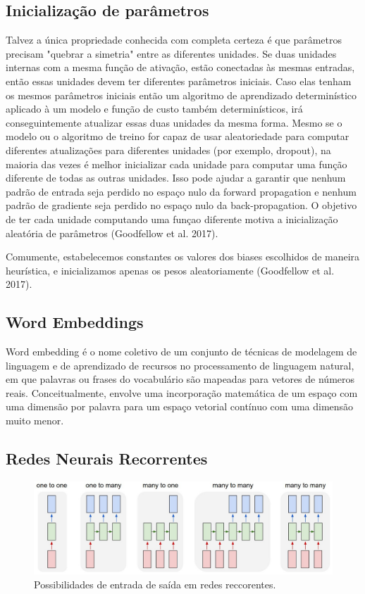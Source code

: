 \documentclass[12pt]{article}
\begin{document}
\subsection{Inicialização de parâmetros}

Talvez a única propriedade conhecida com completa certeza é que parâmetros precisam "quebrar a simetria" entre as diferentes unidades. Se duas unidades internas com a mesma função de ativação, estão conectadas às mesmas entradas, então essas unidades devem ter diferentes parâmetros iniciais. Caso elas tenham os mesmos parâmetros iniciais então um algoritmo de aprendizado determinístico aplicado à um modelo e função de custo também determinísticos, irá conseguintemente atualizar essas duas unidades da mesma forma. Mesmo se o modelo ou o algoritmo de treino for capaz de usar aleatoriedade para computar diferentes atualizações para diferentes unidades (por exemplo, dropout), na maioria das vezes é melhor inicializar cada unidade para computar uma função diferente de todas as outras unidades. Isso pode ajudar a garantir que nenhum padrão de entrada seja perdido no espaço nulo da forward propagation e nenhum padrão de gradiente seja perdido no espaço nulo da back-propagation. O objetivo de ter cada unidade computando uma funçao diferente motiva a inicialização aleatória de parâmetros (Goodfellow et al. 2017).

Comumente, estabelecemos constantes os valores dos biases escolhidos de maneira heurística, e inicializamos apenas os pesos aleatoriamente (Goodfellow et al. 2017).

\subsection{Word Embeddings}

Word embedding é o nome coletivo de um conjunto de técnicas de modelagem de linguagem e de aprendizado de recursos no processamento de linguagem natural, em que palavras ou frases do vocabulário são mapeadas para vetores de números reais. Conceitualmente, envolve uma incorporação matemática de um espaço com uma dimensão por palavra para um espaço vetorial contínuo com uma dimensão muito menor.

\subsection{Redes Neurais Recorrentes}

\begin{figure}[ht]
\centering
\includegraphics[width=1\textwidth]{images/rnn-effectiveness-examples.jpeg}
\caption{
    Possibilidades de entrada de saída em redes reccorentes. \cite{karpathy:2015}
}
\label{fig:sigmoid}
\end{figure}
\end{document}
